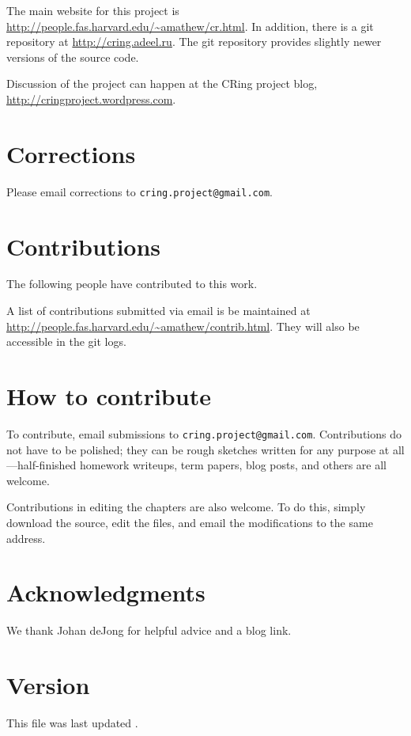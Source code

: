The main website for this project is 
\url{http://people.fas.harvard.edu/~amathew/cr.html}. In addition, there is a
git repository at \url{http://cring.adeel.ru}. The git repository provides
slightly newer versions of the source code.

Discussion of the project can happen at the CRing project blog,
\url{http://cringproject.wordpress.com}.

\section*{Corrections}

Please email corrections to \texttt{cring.project@gmail.com}.

\section*{Contributions}

The following people have contributed to this work.

\vspace{5mm}
\vspace{5mm}

A list of contributions submitted via email is be maintained at 
\url{http://people.fas.harvard.edu/~amathew/contrib.html}.
They will also be accessible in the git logs.

\section*{How to contribute}

To contribute, email submissions to \texttt{cring.project@gmail.com}. 
Contributions do not have to be polished; they can be rough sketches written
for any purpose at all---half-finished homework writeups, term papers, blog
posts, and others are all welcome.

Contributions in editing the chapters are also welcome. To do this, simply
download the source, edit the files, and email the modifications to the same
address.

\section*{Acknowledgments}

We thank Johan deJong for helpful advice and a blog link.

\section*{Version}

This file was last updated .

\tableofcontents